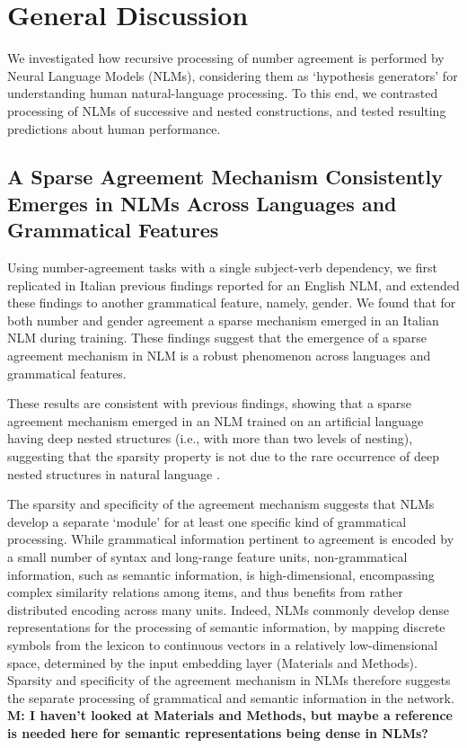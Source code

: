 \section{General Discussion}
We investigated how recursive processing of number agreement is performed by Neural Language Models (NLMs), considering them as `hypothesis generators' for understanding human natural-language processing. To this end, we contrasted processing of NLMs of successive and nested constructions, and tested resulting predictions about human performance. 

\subsection{A Sparse Agreement Mechanism Consistently Emerges in NLMs Across Languages and Grammatical Features}
Using number-agreement tasks with a single subject-verb dependency, we first replicated in Italian previous findings reported for an English NLM, and extended these findings to another grammatical feature, namely, gender. We found that for both number and gender agreement a sparse mechanism emerged in an Italian NLM during training. These findings suggest that the emergence of a sparse agreement mechanism in NLM is a robust phenomenon across languages and grammatical features. 

These results are consistent with previous findings, showing that a sparse agreement mechanism emerged in an NLM trained on an artificial language having deep nested structures (i.e., with more than two levels of nesting), suggesting that the sparsity property is not due to the rare occurrence of deep nested structures in natural language \citep{lakretz2020recursion}. 

The sparsity and specificity of the agreement mechanism suggests that NLMs develop a separate `module' for at least one specific kind of grammatical processing. While grammatical information pertinent to agreement is encoded by a small number of syntax and long-range feature units, non-grammatical information, such as semantic information, is high-dimensional, encompassing complex similarity relations among items, and thus benefits from rather distributed encoding across many units. Indeed, NLMs commonly develop dense representations for the processing of semantic information, by mapping discrete symbols from the lexicon to continuous vectors in a relatively low-dimensional space, determined by the input embedding layer (Materials and Methods). Sparsity and specificity of the agreement mechanism in NLMs therefore suggests the separate processing of grammatical and semantic information in the network. \textbf{M: I haven't looked at Materials and Methods, but maybe a reference is needed here for semantic representations being dense in NLMs?}

